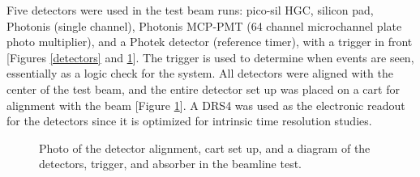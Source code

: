 \documentclass[twocolumn,aps,prd,reprint]{revtex4-1}
\begin{document}
Five detectors were used in the test beam runs: pico-sil HGC, silicon pad, Photonis (single channel), Photonis MCP-PMT (64 channel microchannel plate photo multiplier), and a Photek detector (reference timer), with a trigger in front [Figures \ref{detectors} and \ref{beam line}]. The trigger is used to determine when events are seen, essentially as a logic check for the system. All detectors were aligned with the center of the test beam, and the entire detector set up was placed on a cart for alignment with the beam [Figure \ref{beam line}]. A DRS4 was used as the electronic readout for the detectors since it is optimized for intrinsic time resolution studies.

\begin{figure}[!htbp]
\centering
{} 
\hspace{8mm}
\caption{Photo of the detector alignment, cart set up, and a diagram of the detectors, trigger, and absorber in the beamline test.}
\label{beam line}
\end{figure}
\end{document}
